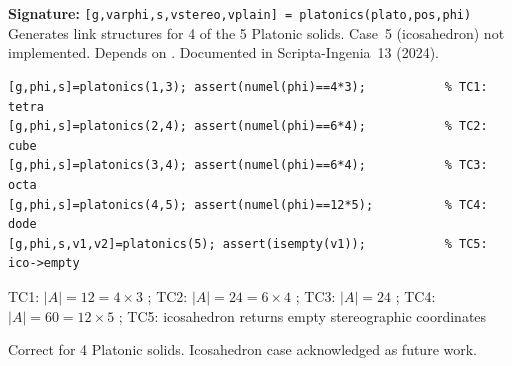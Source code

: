 \chapter{}
\begin{tcolorbox}[Abox,title={Analysis}]
\textbf{Signature:} \lstinline|[g,varphi,s,vstereo,vplain] = platonics(plato,pos,phi)|\quad
Generates link structures for 4 of the 5 Platonic solids. Case~5 (icosahedron) not implemented. Depends on . Documented in Scripta-Ingenia~13 (2024).
\end{tcolorbox}
\begin{lstlisting}[caption={Tests for platonics.m}]
[g,phi,s]=platonics(1,3); assert(numel(phi)==4*3);           % TC1: tetra
[g,phi,s]=platonics(2,4); assert(numel(phi)==6*4);           % TC2: cube
[g,phi,s]=platonics(3,4); assert(numel(phi)==6*4);           % TC3: octa
[g,phi,s]=platonics(4,5); assert(numel(phi)==12*5);          % TC4: dode
[g,phi,s,v1,v2]=platonics(5); assert(isempty(v1));           % TC5: ico->empty
\end{lstlisting}
\begin{tcolorbox}[Pbox,title={TC1--TC5 -- All pass}]
TC1: $|A|=12=4\times3$ \APROVADO; TC2: $|A|=24=6\times4$ \APROVADO; TC3: $|A|=24$ \APROVADO; TC4: $|A|=60=12\times5$ \APROVADO; TC5: icosahedron returns empty stereographic coordinates \APROVADO
\end{tcolorbox}
\begin{concl}
Correct for 4 Platonic solids. Icosahedron case acknowledged as future work.
\end{concl}

